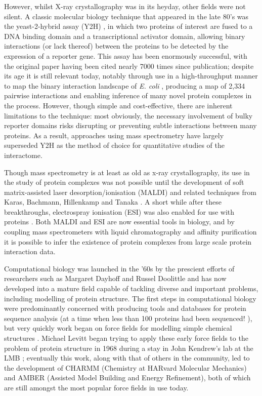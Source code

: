 \documentclass[a4paper,11pt,twoside,openright]{scrbook}
\begin{document}
However, whilst X-ray crystallography was in its heyday, other fields were not silent. A classic molecular biology technique that appeared in the late 80's was the yeast-2-hybrid assay (Y2H) \cite{Fields1989}, in which two proteins of interest are fused to a DNA binding domain and a transcriptional activator domain, allowing binary interactions (or lack thereof) between the proteins to be detected by the expression of a reporter gene. This assay has been enormously successful, with the original paper having been cited nearly 7000 times since publication; despite its age it is still relevant today, notably through use in a high-throughput manner to map the binary interaction landscape of \textit{E. coli} \cite{Rajagopala2014}, producing a map of 2,334 pairwise interactions and enabling inference of many novel protein complexes in the process. However, though simple and cost-effective, there are inherent limitations to the technique: most obviously, the necessary involvement of bulky reporter domains risks disrupting or preventing subtle interactions between many proteins. As a result, approaches using mass spectrometry have largely superseded Y2H as the method of choice for quantitative studies of the interactome.

Though mass spectrometry is at least as old as x-ray crystallography, its use in the study of protein complexes was not possible until the development of soft matrix-assisted laser desorption/ionisation (MALDI) and related techniques from Karas, Bachmann, Hillenkamp and Tanaka \cite{Karas1985,Tanaka1988}. A short while after these breakthroughs, electrospray ionisation (ESI) was also enabled for use with proteins \cite{Fenn1989}. Both MALDI and ESI are now essential tools in biology, and by coupling mass spectrometers with liquid chromatography and affinity purification it is possible to infer the existence of protein complexes from large scale protein interaction data.

Computational biology was launched in the '60s by the prescient efforts of researchers such as Margaret Dayhoff and Russel Doolittle and has now developed into a mature field capable of tackling diverse and important problems, including modelling of protein structure. The first steps in computational biology were predominantly concerned with producing tools and databases for protein sequence analysis (at a time when less than 100 proteins had been sequenced! \cite{Dayhoff1965}), but very quickly work began on force fields for modelling simple chemical structures \cite{Bixon1967}. Michael Levitt began trying to apply these early force fields to the problem of protein structure in 1968 during a stay in John Kendrew's lab at the LMB \cite{Levitt2001}; eventually this work, along with that of others in the community, led to the development of CHARMM \cite{Brooks2009} (Chemistry at HARvard Molecular Mechanics) and AMBER \cite{Salomon-Ferrer2013,Amber2017} (Assisted Model Building and Energy Refinement), both of which are still amongst the most popular force fields in use today.
\end{document}
